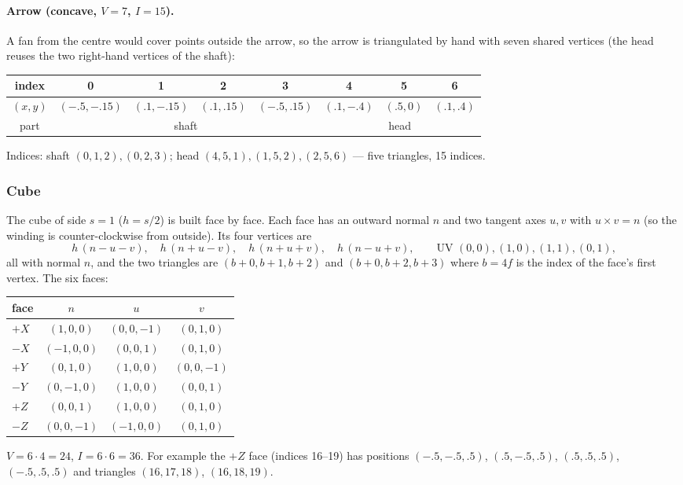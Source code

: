 \documentclass[a4paper, 11pt]{article}
\begin{document}
\paragraph{Arrow (concave, $V=7$, $I=15$).}
A fan from the centre would cover points outside the arrow, so the arrow is triangulated by hand with seven shared vertices
(the head reuses the two right-hand vertices of the shaft):
\begin{center}
\small
\begin{tabular}{@{}c|ccccccc@{}}
index & 0 & 1 & 2 & 3 & 4 & 5 & 6\\
\midrule
$(x,y)$ & $(-.5,-.15)$ & $(.1,-.15)$ & $(.1,.15)$ & $(-.5,.15)$ & $(.1,-.4)$ & $(.5,0)$ & $(.1,.4)$\\
part & \multicolumn{4}{c}{shaft} & \multicolumn{3}{c}{head}\\
\end{tabular}
\end{center}
Indices: shaft $(0,1,2),(0,2,3)$; head $(4,5,1),(1,5,2),(2,5,6)$ --- five triangles, 15 indices.

\subsubsection{Cube}

The cube of side $s=1$ ($h=s/2$) is built face by face. Each face has an outward normal $n$ and two tangent axes $u,v$ with
$u\times v=n$ (so the winding is counter-clockwise from outside). Its four vertices are
\[
  h\,(n-u-v),\quad h\,(n+u-v),\quad h\,(n+u+v),\quad h\,(n-u+v),
  \qquad \text{UV } (0,0),(1,0),(1,1),(0,1),
\]
all with normal $n$, and the two triangles are $(b{+}0,b{+}1,b{+}2)$ and $(b{+}0,b{+}2,b{+}3)$ where $b=4f$ is the
index of the face's first vertex. The six faces:

\begin{center}
\small
\begin{tabular}{@{}lccc@{}}
\toprule
face & $n$ & $u$ & $v$\\
\midrule
$+X$ & $(1,0,0)$  & $(0,0,-1)$ & $(0,1,0)$\\
$-X$ & $(-1,0,0)$ & $(0,0,1)$  & $(0,1,0)$\\
$+Y$ & $(0,1,0)$  & $(1,0,0)$  & $(0,0,-1)$\\
$-Y$ & $(0,-1,0)$ & $(1,0,0)$  & $(0,0,1)$\\
$+Z$ & $(0,0,1)$  & $(1,0,0)$  & $(0,1,0)$\\
$-Z$ & $(0,0,-1)$ & $(-1,0,0)$ & $(0,1,0)$\\
\bottomrule
\end{tabular}
\end{center}
$V=6\cdot4=24$, $I=6\cdot6=36$. For example the $+Z$ face (indices 16--19) has positions
$(-.5,-.5,.5)$, $(.5,-.5,.5)$, $(.5,.5,.5)$, $(-.5,.5,.5)$ and triangles $(16,17,18)$, $(16,18,19)$.
\end{document}

